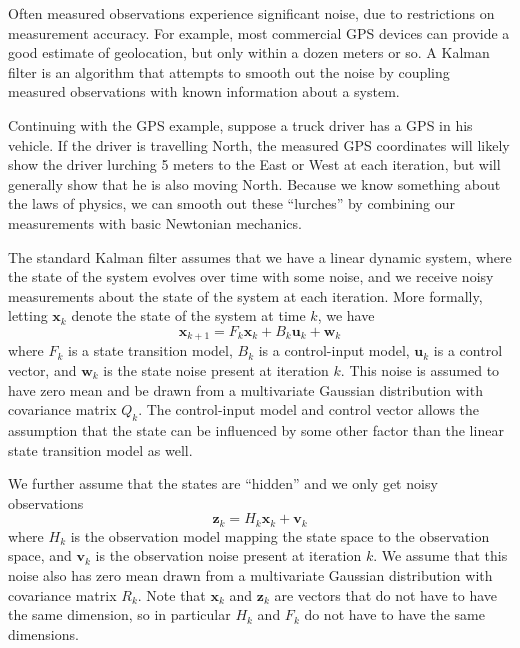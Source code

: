 

Often measured observations experience significant noise, due to restrictions on measurement accuracy. For example, most commercial GPS devices can provide a good estimate of geolocation, but only within a dozen meters or so. A Kalman filter is an algorithm that attempts to smooth out the noise by coupling measured observations with known information about a system. 

Continuing with the GPS example, suppose a truck driver has a GPS in his vehicle. If the driver is travelling North, the measured GPS coordinates will likely show the driver lurching 5 meters to the East or West at each iteration, but will generally show that he is also moving North. Because we know something about the laws of physics, we can smooth out these ``lurches'' by combining our measurements with basic Newtonian mechanics.

The standard Kalman filter assumes that we have a linear dynamic system, where the state of the system evolves over time with some noise, and we receive noisy measurements about the state of the system at each iteration. More formally, letting $\mathbf{x}_{k}$ denote the state of the system at time $k$, we have
$$\mathbf{x}_{k+1} = F_{k} \mathbf{x}_{k} + B_{k}\mathbf{u}_{k} + \mathbf{w}_{k}$$
where $F_{k}$ is a state transition model, $B_{k}$ is a control-input model, $\mathbf{u}_{k}$ is a control vector, and $\mathbf{w}_{k}$ is the state noise present at iteration $k$. This noise is assumed to have zero mean and be drawn from a multivariate Gaussian distribution with covariance matrix $Q_{k}$. The control-input model and control vector allows the assumption that the state can be influenced by some other factor than the linear state transition model as well.

We further assume that the states are ``hidden'' and we only get noisy observations 
$$\mathbf{z}_{k} = H_{k}\mathbf{x}_{k} + \mathbf{v}_{k}$$ where $H_{k}$ is the observation model mapping the state space to the observation space, and $\mathbf{v}_{k}$ is the observation noise present at iteration $k$. We assume that this noise also has zero mean drawn from a multivariate Gaussian distribution with covariance matrix $R_{k}$. Note that $\mathbf{x}_{k}$ and $\mathbf{z}_{k}$ are vectors that do not have to have the same dimension, so in particular $H_{k}$ and $F_{k}$ do not have to have the same dimensions.

